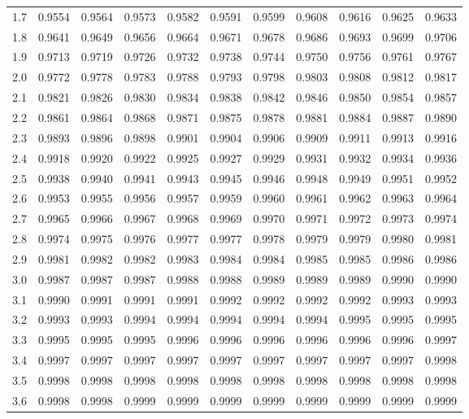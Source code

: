 \documentclass[english]{article}
\begin{document}
{\begin{table}[ht]
\begin{tabular}{r|rrrrrrrrrr}
  1.7 & 0.9554 & 0.9564 & 0.9573 & 0.9582 & 0.9591 & 0.9599 & 0.9608 & 0.9616 & 0.9625 & 0.9633 \\ 
  1.8 & 0.9641 & 0.9649 & 0.9656 & 0.9664 & 0.9671 & 0.9678 & 0.9686 & 0.9693 & 0.9699 & 0.9706 \\ 
  1.9 & 0.9713 & 0.9719 & 0.9726 & 0.9732 & 0.9738 & 0.9744 & 0.9750 & 0.9756 & 0.9761 & 0.9767 \\ 
  2.0 & 0.9772 & 0.9778 & 0.9783 & 0.9788 & 0.9793 & 0.9798 & 0.9803 & 0.9808 & 0.9812 & 0.9817 \\ 
  2.1 & 0.9821 & 0.9826 & 0.9830 & 0.9834 & 0.9838 & 0.9842 & 0.9846 & 0.9850 & 0.9854 & 0.9857 \\ 
  2.2 & 0.9861 & 0.9864 & 0.9868 & 0.9871 & 0.9875 & 0.9878 & 0.9881 & 0.9884 & 0.9887 & 0.9890 \\ 
  2.3 & 0.9893 & 0.9896 & 0.9898 & 0.9901 & 0.9904 & 0.9906 & 0.9909 & 0.9911 & 0.9913 & 0.9916 \\ 
  2.4 & 0.9918 & 0.9920 & 0.9922 & 0.9925 & 0.9927 & 0.9929 & 0.9931 & 0.9932 & 0.9934 & 0.9936 \\ 
  2.5 & 0.9938 & 0.9940 & 0.9941 & 0.9943 & 0.9945 & 0.9946 & 0.9948 & 0.9949 & 0.9951 & 0.9952 \\ 
  2.6 & 0.9953 & 0.9955 & 0.9956 & 0.9957 & 0.9959 & 0.9960 & 0.9961 & 0.9962 & 0.9963 & 0.9964 \\ 
  2.7 & 0.9965 & 0.9966 & 0.9967 & 0.9968 & 0.9969 & 0.9970 & 0.9971 & 0.9972 & 0.9973 & 0.9974 \\ 
  2.8 & 0.9974 & 0.9975 & 0.9976 & 0.9977 & 0.9977 & 0.9978 & 0.9979 & 0.9979 & 0.9980 & 0.9981 \\ 
  2.9 & 0.9981 & 0.9982 & 0.9982 & 0.9983 & 0.9984 & 0.9984 & 0.9985 & 0.9985 & 0.9986 & 0.9986 \\ 
  3.0 & 0.9987 & 0.9987 & 0.9987 & 0.9988 & 0.9988 & 0.9989 & 0.9989 & 0.9989 & 0.9990 & 0.9990 \\ 
  3.1 & 0.9990 & 0.9991 & 0.9991 & 0.9991 & 0.9992 & 0.9992 & 0.9992 & 0.9992 & 0.9993 & 0.9993 \\ 
  3.2 & 0.9993 & 0.9993 & 0.9994 & 0.9994 & 0.9994 & 0.9994 & 0.9994 & 0.9995 & 0.9995 & 0.9995 \\ 
  3.3 & 0.9995 & 0.9995 & 0.9995 & 0.9996 & 0.9996 & 0.9996 & 0.9996 & 0.9996 & 0.9996 & 0.9997 \\ 
  3.4 & 0.9997 & 0.9997 & 0.9997 & 0.9997 & 0.9997 & 0.9997 & 0.9997 & 0.9997 & 0.9997 & 0.9998 \\ 
  3.5 & 0.9998 & 0.9998 & 0.9998 & 0.9998 & 0.9998 & 0.9998 & 0.9998 & 0.9998 & 0.9998 & 0.9998 \\ 
  3.6 & 0.9998 & 0.9998 & 0.9999 & 0.9999 & 0.9999 & 0.9999 & 0.9999 & 0.9999 & 0.9999 & 0.9999 \\ 
\end{tabular}
\end{table}
}
	
	
\end{document}

